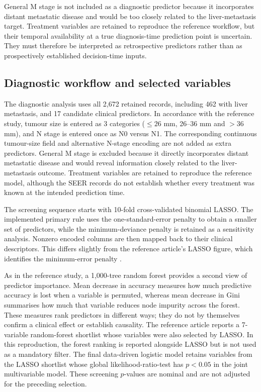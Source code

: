 General M stage is not included as a diagnostic predictor because it incorporates
distant metastatic disease and would be too closely related to the liver-metastasis
target. Treatment variables are retained to reproduce the reference workflow, but
their temporal availability at a true diagnosis-time prediction point is uncertain.
They must therefore be interpreted as retrospective predictors rather than as
prospectively established decision-time inputs.

\subsection{Diagnostic workflow and selected variables}
\label{sec:reference:diagnostic_methods}

The diagnostic analysis uses all 2,672 retained records, including 462 with liver
metastasis, and 17 candidate clinical predictors. In accordance with the reference
study, tumour size is entered as 3 categories ($\leq26$ mm, 26--36 mm and
$>36$ mm), and N stage is entered once as N0 versus N1. The corresponding
continuous tumour-size field and alternative N-stage encoding are not added as
extra predictors. General M stage is excluded because it directly incorporates
distant metastatic disease and would reveal information closely related to the
liver-metastasis outcome. Treatment variables are retained to reproduce the
reference model, although the SEER records do not establish whether every
treatment was known at the intended prediction time.

The screening sequence starts with 10-fold cross-validated binomial LASSO. The
implemented primary rule uses the one-standard-error penalty to obtain a smaller
set of predictors, while the minimum-deviance penalty is retained as a sensitivity
analysis. Nonzero encoded columns are then mapped back to their clinical
descriptors. This differs slightly from the reference article's LASSO figure,
which identifies the minimum-error penalty \citep{Li2023}.

As in the reference study, a 1,000-tree random forest provides a second view of
predictor importance. Mean decrease in accuracy measures how much predictive
accuracy is lost when a variable is permuted, whereas mean decrease in Gini
summarises how much that variable reduces node impurity across the forest. These
measures rank predictors in different ways; they do not by themselves confirm a
clinical effect or establish causality. The reference article reports a
7-variable random-forest shortlist whose variables were also selected by LASSO.
In this reproduction, the forest ranking is reported alongside LASSO but is not
used as a mandatory filter. The final
data-driven logistic model retains variables from the LASSO shortlist whose global
likelihood-ratio-test has $p<0.05$ in the joint multivariable model. These
screening $p$-values are nominal and are not adjusted for the preceding selection.

